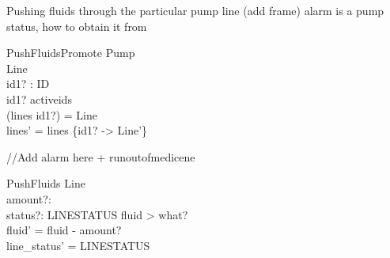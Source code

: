 \documentclass{article}
\begin{document}
	
	Pushing fluids through the particular pump line (add frame) alarm is a pump status, how to obtain it from
	
	\begin{schema}{PushFluidsPromote}
		\Delta Pump	\\
		\Delta Line \\
		id1? : ID \\
	\where 
		id1? \in activeids \\
		(lines id1?) = \theta Line \\
		lines' = lines \oplus \{id1? -> \theta Line'\} \\		
	\end{schema}
	
	//Add alarm here + runoutofmedicene
	\begin{schema}{PushFluids}
		\Delta Line \\
		amount?: \nat \\
		status?: LINESTATUS
	\where 
		fluid > what? \\
		fluid' = fluid - amount? \\
		line_status' = LINESTATUS
	\end{schema}
\end{document}

